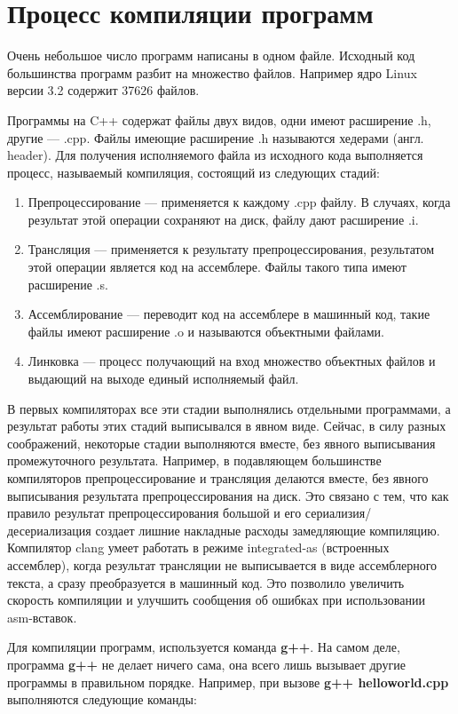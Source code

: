 \section{Процесс компиляции программ}
Очень небольшое число программ написаны в одном файле. Исходный код большинства программ разбит на множество файлов. Например ядро Linux версии 3.2 содержит 37626 файлов.

Программы на C++ содержат файлы двух видов, одни имеют расширение .h, другие --- .cpp. Файлы имеющие расширение .h называются хедерами (англ. header). Для получения исполняемого файла из исходного кода выполняется процесс, называемый компиляция, состоящий из следующих стадий:

\begin{enumerate}
\item Препроцессирование --- применяется к каждому .cpp файлу. В случаях, когда результат этой операции сохраняют на диск, файлу дают расширение .i.
\item Трансляция --- применяется к результату препроцессирования, результатом этой операции является код на ассемблере. Файлы такого типа имеют расширение .s.
\item Ассемблирование --- переводит код на ассемблере в машинный код, такие файлы имеют расширение .o и называются объектными файлами.
\item Линковка --- процесс получающий на вход множество объектных файлов и выдающий на выходе единый исполняемый файл.
\end{enumerate}

В первых компиляторах все эти стадии выполнялись отдельными программами, а результат работы этих стадий выписывался в явном виде. Сейчас, в силу разных соображений, некоторые стадии выполняются вместе, без явного выписывания промежуточного результата. Например, в подавляющем большинстве компиляторов препроцессирование и трансляция делаются вместе, без явного выписывания результата препроцессирования на диск. Это связано с тем, что как правило результат препроцессирования большой и его сериализия/десериализация создает лишние накладные расходы замедляющие компиляцию. Компилятор clang умеет работать в режиме integrated-as (встроенных ассемблер), когда результат трансляции не выписывается в виде ассемблерного текста, а сразу преобразуется в машинный код. Это позволило увеличить скорость компиляции и улучшить сообщения об ошибках при использовании asm-вставок.

Для компиляции программ, используется команда {\bf g++}. На самом деле, программа {\bf g++} не делает ничего сама, она всего лишь вызывает другие программы в правильном порядке. Например, при вызове {\bf g++ helloworld.cpp} выполняются следующие команды:

